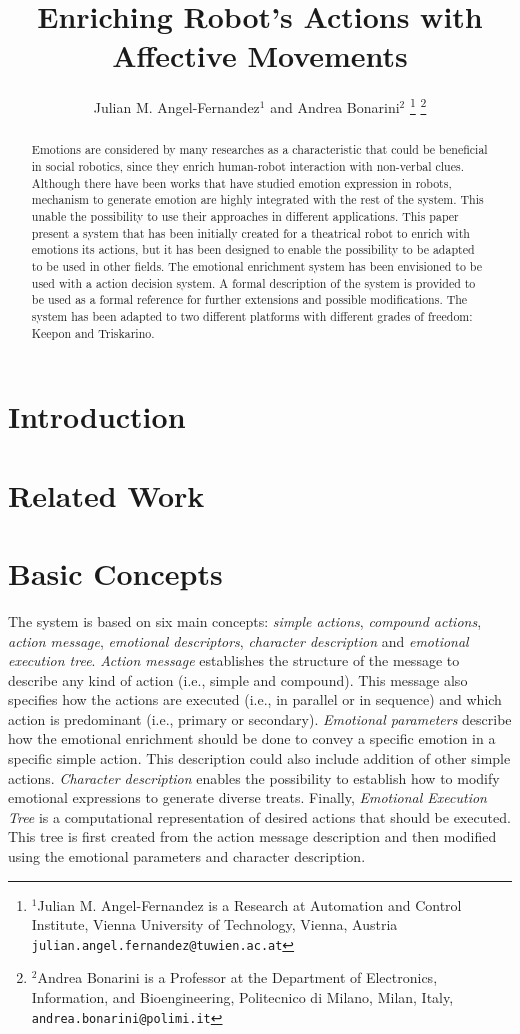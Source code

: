 \documentclass[letterpaper, 10 pt, conference]{ieeeconf}  %
\title{\LARGE \bf
Enriching Robot's Actions with Affective Movements
}
\author{Julian M. Angel-Fernandez$^{1}$ and Andrea Bonarini$^{2}$%
\thanks{$^{1}$Julian M. Angel-Fernandez is a Research at Automation and Control Institute, Vienna University of Technology, Vienna, Austria
        {\tt\small julian.angel.fernandez@tuwien.ac.at}}%
\thanks{$^{2}$Andrea Bonarini is a Professor at the Department of Electronics, Information, and Bioengineering, Politecnico di Milano, Milan, Italy,
        {\tt\small andrea.bonarini@polimi.it}}%
}
\begin{document}
\maketitle
\thispagestyle{empty}
\pagestyle{empty}


\begin{abstract}
Emotions are considered by many researches as a characteristic that could be beneficial in social robotics, since they enrich human-robot interaction with non-verbal clues. Although there have been works that have studied emotion expression in robots, mechanism to generate emotion are highly integrated with the rest of the system. This unable the possibility to use their approaches in different applications. This paper present a system that has been initially created for a theatrical robot to enrich with emotions its actions, but it has been designed to enable the possibility to be adapted to be used in other fields. The emotional enrichment system has been envisioned to be used with a action decision system. A formal description of the system is provided to be used as a formal reference for further extensions and possible modifications. The system has been adapted to two different platforms with different grades of freedom: Keepon and Triskarino. 
\end{abstract}

\section{Introduction}

\section{Related Work}

\section{Basic Concepts}
\label{sec:concepts}
The system is based on six main concepts: \textit{simple actions}, \textit{compound actions}, \textit{action message}, \textit{emotional descriptors}, \textit{character description} and \textit{emotional execution tree}. \textit{Action message} establishes the structure of the message to describe any kind of action (i.e., simple and compound). This message also specifies how the actions are executed (i.e., in parallel or in sequence) and which action is predominant (i.e., primary or secondary). \textit{Emotional parameters} describe how the emotional enrichment should be done to convey a specific emotion in a specific simple action. This description could also include addition of other simple actions. \textit{Character description} enables the possibility to establish how to modify emotional expressions to generate diverse treats. Finally, \textit{Emotional Execution Tree} is a computational representation of desired actions that should be executed. This tree is first created from the action message description and then modified using the emotional parameters and character description.  
\end{document}
